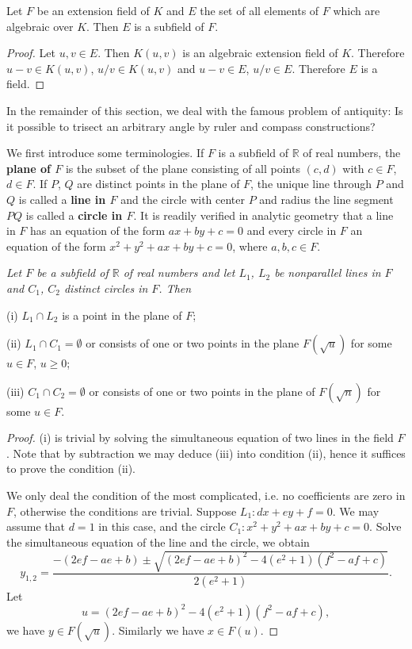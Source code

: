 \begin{theorem}
Let $F$ be an extension field of $K$ and $E$ the set of all elements of $F$ which are algebraic over $K$. Then $E$ is a subfield of $F$.
\end{theorem}
\begin{proof}
Let $u,v\in E$. Then $K(u,v)$ is an algebraic extension field of $K$. Therefore $u-v\in K(u,v)$, $u/v\in K(u,v)$ and $u-v\in E$, $u/v\in E$. Therefore $E$ is a field.
\end{proof}
In the remainder of this section, we deal with the famous problem of antiquity: Is it possible to trisect an arbitrary angle by ruler and compass constructions?\par
We first introduce some terminologies. If $F$ is a subfield of $\mathbb{R}$ of real numbers, the \textbf{plane of $F$} is the subset of the plane consisting of all points $(c,d)$ with $c\in F$, $d\in F$. If $P$, $Q$ are distinct points in the plane of $F$, the unique line through $P$ and $Q$ is called a \textbf{line in $F$} and the circle with center $P$ and radius the line segment $PQ$ is called a \textbf{circle in $F$}. It is readily verified in analytic geometry that a line in $F$ has an equation of the form $ax+by+c=0$ and every circle in $F$ an equation of the form $x^2+y^2+ax+by+c=0$, where $a,b,c\in F$.
\begin{lemma}\em
Let $F$ be a subfield of $\mathbb{R}$ of real numbers and let $L_1$, $L_2$ be nonparallel lines in $F$ and $C_1$, $C_2$ distinct circles in $F$. Then \par
(i) $L_1\cap L_2$ is a point in the plane of $F$;\par
(ii) $L_1\cap C_1=\emptyset$ or consists of one or two points in the plane $F(\sqrt{u})$ for some $u\in F$, $u\ge 0$;\par
(iii) $C_1\cap C_2=\emptyset$ or consists of one or two points in the plane of $F(\sqrt{n})$ for some $u\in F$.
\end{lemma}
\begin{proof}
(i) is trivial by solving the simultaneous equation of two lines in the field $F$. Note that by subtraction we may deduce (iii) into condition (ii), hence it suffices to prove the condition (ii).\par
We only deal the condition of the most complicated, i.e. no coefficients are zero in $F$, otherwise the conditions are trivial. Suppose $L_1:dx+ey+f=0$. We may assume that $d=1$ in this case, and the circle $C_1:x^2+y^2+ax+by+c=0$. Solve the simultaneous equation of the line and the circle, we obtain 
$$
y_{1,2}=\frac{-\left( 2ef-ae+b \right) \pm \sqrt{\left( 2ef-ae+b \right) ^2-4\left( e^2+1 \right) \left( f^2-af+c \right)}}{2\left( e^2+1 \right)}.
$$
Let 
$$
u=\left( 2ef-ae+b \right) ^2-4\left( e^2+1 \right) \left( f^2-af+c \right) ,
$$
we have $y\in F(\sqrt{u})$. Similarly we have $x\in F(u)$.
\end{proof}
